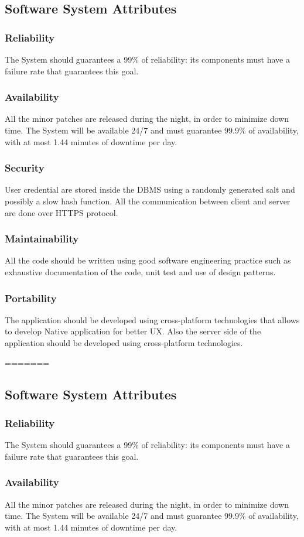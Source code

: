 \documentclass[a4paper, 12pt, oneside]{article}
\begin{document}
\begin{enumerate}[labelindent=20pt, label={UC.\arabic*}, itemindent=1em,leftmargin=!]
\subsection{Software System Attributes}
\subsubsection{Reliability}
The System should guarantees a 99\% of reliability: its components must have
a failure rate that guarantees this goal. 
\subsubsection{Availability}
All the minor patches are released during the night, in order to minimize down time.
The System will be available 24/7 and must guarantee 99.9\% of availability, with at most 1.44 minutes of downtime per day.  
\subsubsection{Security}
User credential are stored inside the DBMS using a randomly generated salt and possibly a slow hash function. All the communication between client and server are done over HTTPS protocol.  
\subsubsection{Maintainability}
All the code should be written using good software engineering practice such as exhaustive documentation of the code, unit test and use of design patterns.
\subsubsection{Portability}
The application should be developed using cross-platform technologies that allows to develop Native application for better UX.
Also the server side of the application should be developed using cross-platform technologies.

=======
\subsection{Software System Attributes}
\subsubsection{Reliability}
The System should guarantees a 99\% of reliability: its components must have
a failure rate that guarantees this goal. 
\subsubsection{Availability}
All the minor patches are released during the night, in order to minimize down time.
The System will be available 24/7 and must guarantee 99.9\% of availability, with at most 1.44 minutes of downtime per day.  

\end{enumerate}
\end{document}
